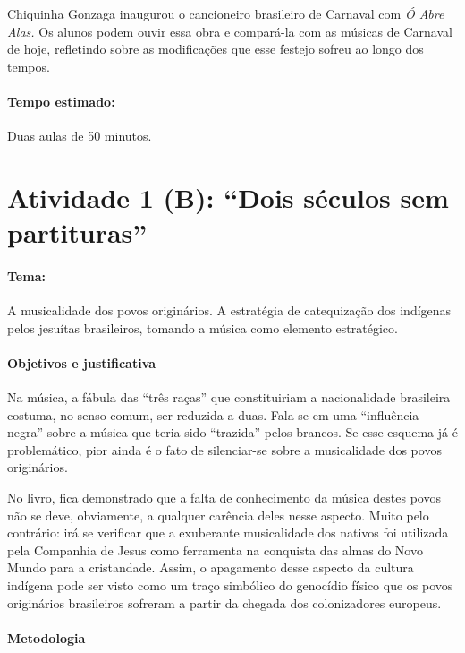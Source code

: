 \documentclass[11pt]{extarticle}
\begin{document}
Chiquinha Gonzaga inaugurou o cancioneiro brasileiro de Carnaval com
\emph{Ó Abre Alas.} Os alunos podem ouvir essa obra e compará-la com as
músicas de Carnaval de hoje, refletindo sobre as modificações que esse
festejo sofreu ao longo dos tempos.

\paragraph{Tempo estimado:} Duas aulas de 50 minutos.



\section{Atividade 1 (B): “Dois séculos sem partituras”}

\paragraph{Tema:} A musicalidade dos povos originários. A estratégia de catequização dos
indígenas pelos jesuítas brasileiros, tomando a música como elemento
estratégico.  


\paragraph{Objetivos e justificativa}

Na música, a fábula das “três raças” que constituiriam a nacionalidade
brasileira costuma, no senso comum, ser reduzida a duas. Fala-se em uma
“influência negra” sobre a música que teria sido “trazida” pelos brancos. Se
esse esquema já é problemático, pior ainda é o fato de silenciar-se sobre a
musicalidade dos povos originários.

No livro, fica demonstrado que a falta de conhecimento da música destes povos
não se deve, obviamente, a qualquer carência deles nesse aspecto. Muito pelo
contrário: irá se verificar que a exuberante musicalidade dos nativos foi
utilizada pela Companhia de Jesus como ferramenta na conquista das almas do
Novo Mundo para a cristandade. Assim, o apagamento desse aspecto da cultura
indígena pode ser visto como um traço simbólico do genocídio físico que os
povos originários brasileiros sofreram a partir da chegada dos colonizadores
europeus. 


\paragraph{Metodologia}
\end{document}
